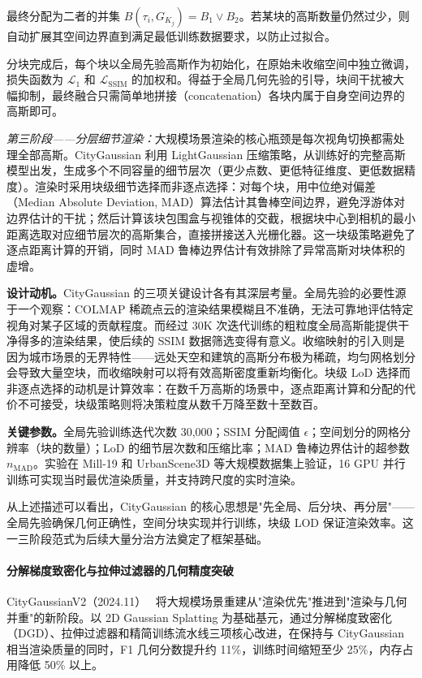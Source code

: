 最终分配为二者的并集 $B(\tau_i, G_{K_j}) = B_1 \lor B_2$。若某块的高斯数量仍然过少，则自动扩展其空间边界直到满足最低训练数据要求，以防止过拟合。

分块完成后，每个块以全局先验高斯作为初始化，在原始未收缩空间中独立微调，损失函数为 $\mathcal{L}_1$ 和 $\mathcal{L}_{\text{SSIM}}$ 的加权和。得益于全局几何先验的引导，块间干扰被大幅抑制，最终融合只需简单地拼接（concatenation）各块内属于自身空间边界的高斯即可。

\emph{第三阶段——分层细节渲染：}大规模场景渲染的核心瓶颈是每次视角切换都需处理全部高斯。CityGaussian 利用 LightGaussian 压缩策略，从训练好的完整高斯模型出发，生成多个不同容量的细节层次（更少点数、更低特征维度、更低数据精度）。渲染时采用块级细节选择而非逐点选择：对每个块，用中位绝对偏差（Median Absolute Deviation, MAD）算法估计其鲁棒空间边界，避免浮游体对边界估计的干扰；然后计算该块包围盒与视锥体的交截，根据块中心到相机的最小距离选取对应细节层次的高斯集合，直接拼接送入光栅化器。这一块级策略避免了逐点距离计算的开销，同时 MAD 鲁棒边界估计有效排除了异常高斯对块体积的虚增。

\textbf{设计动机。}CityGaussian 的三项关键设计各有其深层考量。全局先验的必要性源于一个观察：COLMAP 稀疏点云的渲染结果模糊且不准确，无法可靠地评估特定视角对某子区域的贡献程度。而经过 30K 次迭代训练的粗粒度全局高斯能提供干净得多的渲染结果，使后续的 SSIM 数据筛选变得有意义。收缩映射的引入则是因为城市场景的无界特性——远处天空和建筑的高斯分布极为稀疏，均匀网格划分会导致大量空块，而收缩映射可以将有效高斯密度重新均衡化。块级 LoD 选择而非逐点选择的动机是计算效率：在数千万高斯的场景中，逐点距离计算和分配的代价不可接受，块级策略则将决策粒度从数千万降至数十至数百。

\textbf{关键参数。}全局先验训练迭代次数 30{,}000；SSIM 分配阈值 $\epsilon$；空间划分的网格分辨率（块的数量）；LoD 的细节层次数和压缩比率；MAD 鲁棒边界估计的超参数 $n_{\text{MAD}}$。实验在 Mill-19 和 UrbanScene3D 等大规模数据集上验证，16 GPU 并行训练可实现当时最优渲染质量，并支持跨尺度的实时渲染。

从上述描述可以看出，CityGaussian 的核心思想是"先全局、后分块、再分层"——全局先验确保几何正确性，空间分块实现并行训练，块级 LOD 保证渲染效率。这一三阶段范式为后续大量分治方法奠定了框架基础。

\paragraph{分解梯度致密化与拉伸过滤器的几何精度突破}

CityGaussianV2（2024.11）~\cite{2411_00771} 将大规模场景重建从"渲染优先"推进到"渲染与几何并重"的新阶段。以 2D Gaussian Splatting 为基础基元，通过分解梯度致密化（DGD）、拉伸过滤器和精简训练流水线三项核心改进，在保持与 CityGaussian 相当渲染质量的同时，F1 几何分数提升约 11\%，训练时间缩短至少 25\%，内存占用降低 50\% 以上。

